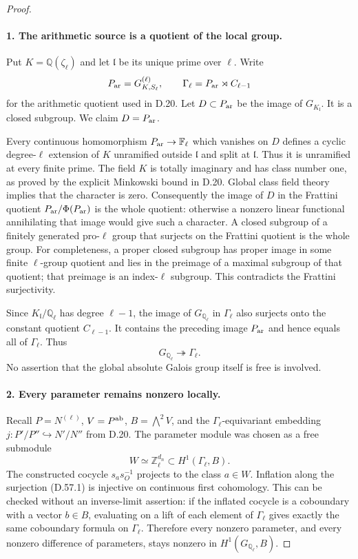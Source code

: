 \begin{proof}
\paragraph{1. The arithmetic source is a quotient of the local group.}

Put $K=\mathbb Q(\zeta_\ell)$ and let $\mathfrak l$ be its
unique prime over $\ell$.  Write
\[
 P_{\rm ar}=G_{K,S_\ell}^{(\ell)},\qquad
 \Gamma_\ell=P_{\rm ar}\rtimes C_{\ell-1}
\]
for the arithmetic quotient used in D.20.  Let
$D\subset P_{\rm ar}$ be the image of $G_{K_{\mathfrak l}}$.
It is a closed subgroup.  We claim $D=P_{\rm ar}$.

Every continuous homomorphism $P_{\rm ar}\to\mathbb F_\ell$
which vanishes on $D$ defines a cyclic degree-$\ell$ extension
of $K$ unramified outside $\mathfrak l$ and split at
$\mathfrak l$.  Thus it is unramified at every finite prime.
The field $K$ is totally imaginary and has class number one,
as proved by the explicit Minkowski bound in D.20.  Global
class field theory implies that the character is zero.
Consequently the image of $D$ in the Frattini quotient
$P_{\rm ar}/\Phi(P_{\rm ar})$ is the whole quotient: otherwise
a nonzero linear functional annihilating that image would
give such a character.  A closed subgroup of a finitely
generated pro-$\ell$ group that surjects on the Frattini quotient
is the whole group.  For completeness, a proper closed subgroup
has proper image in some finite $\ell$-group quotient and lies
in the preimage of a maximal subgroup of that quotient; that
preimage is an index-$\ell$ subgroup.  This contradicts the
Frattini surjectivity.

Since $K_{\mathfrak l}/\mathbb Q_\ell$ has degree $\ell-1$,
the image of $G_{\mathbb Q_\ell}$ in $\Gamma_\ell$ also
surjects onto the constant quotient $C_{\ell-1}$.  It contains
the preceding image $P_{\rm ar}$ and hence equals all of
$\Gamma_\ell$.  Thus
\[
                 G_{\mathbb Q_\ell}\twoheadrightarrow\Gamma_\ell.
                                                        \tag{D.57.1}
\]
No assertion that the global absolute Galois group itself is
free is involved.

\paragraph{2. Every parameter remains nonzero locally.}

Recall $P=N^{(\ell)}$, $V=P^{\rm ab}$,
$B=\bigwedge^2 V$, and the $\Gamma_\ell$-equivariant embedding
$j:P'/P''\hookrightarrow N'/N''$ from D.20.  The parameter
module was chosen as a free submodule
\[
 W\simeq\mathbb Z_\ell^{d_n}
          \subset H^1(\Gamma_\ell,B).
\]
The constructed cocycle $s_a s_O^{-1}$ projects to the class
$a\in W$.  Inflation along the surjection (D.57.1) is injective
on continuous first cohomology.  This can be checked without
an inverse-limit assertion: if the inflated cocycle is a
coboundary with a vector $b\in B$, evaluating on a lift of
each element of $\Gamma_\ell$ gives exactly the same
coboundary formula on $\Gamma_\ell$.  Therefore every nonzero
parameter, and every nonzero difference of parameters, stays
nonzero in $H^1(G_{\mathbb Q_\ell},B)$.


\end{proof}

